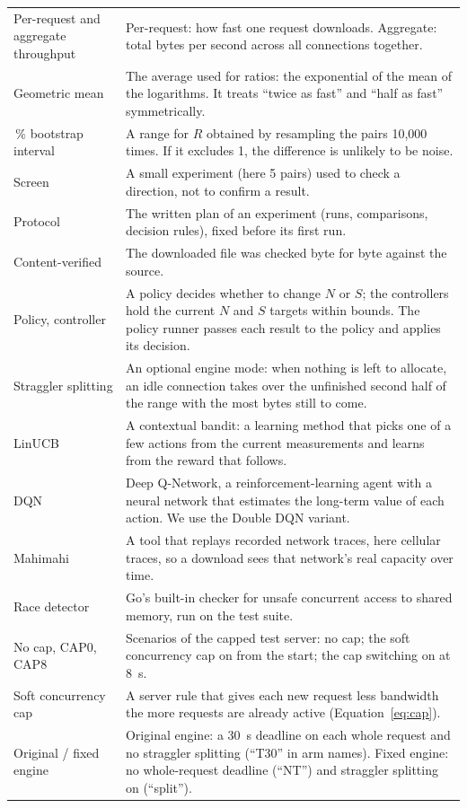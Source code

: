 \begin{longtable}{@{}>{\raggedright\arraybackslash}p{3.6cm}>{\raggedright\arraybackslash}p{11.6cm}@{}}
Per-request and aggregate throughput & Per-request: how fast one request downloads. Aggregate: total bytes per second across all connections together.\\
Geometric mean & The average used for ratios: the exponential of the mean of the logarithms. It treats ``twice as fast'' and ``half as fast'' symmetrically.\\
95\,\% bootstrap interval & A range for $R$ obtained by resampling the pairs 10{,}000 times. If it excludes 1, the difference is unlikely to be noise.\\
Screen & A small experiment (here 5 pairs) used to check a direction, not to confirm a result.\\
Protocol & The written plan of an experiment (runs, comparisons, decision rules), fixed before its first run.\\
Content-verified & The downloaded file was checked byte for byte against the source.\\
Policy, controller & A policy decides whether to change $N$ or $S$; the controllers hold the current $N$ and $S$ targets within bounds. The policy runner passes each result to the policy and applies its decision.\\
Straggler splitting & An optional engine mode: when nothing is left to allocate, an idle connection takes over the unfinished second half of the range with the most bytes still to come.\\
LinUCB & A contextual bandit: a learning method that picks one of a few actions from the current measurements and learns from the reward that follows.\\
DQN & Deep Q-Network, a reinforcement-learning agent with a neural network that estimates the long-term value of each action. We use the Double DQN variant.\\
Mahimahi & A tool that replays recorded network traces, here cellular traces, so a download sees that network's real capacity over time.\\
Race detector & Go's built-in checker for unsafe concurrent access to shared memory, run on the test suite.\\
No cap, CAP0, CAP8 & Scenarios of the capped test server: no cap; the soft concurrency cap on from the start; the cap switching on at 8~s.\\
Soft concurrency cap & A server rule that gives each new request less bandwidth the more requests are already active (Equation~\ref{eq:cap}).\\
Original / fixed engine & Original engine: a 30~s deadline on each whole request and no straggler splitting (``T30'' in arm names). Fixed engine: no whole-request deadline (``NT'') and straggler splitting on (``split'').\\

\end{longtable}
